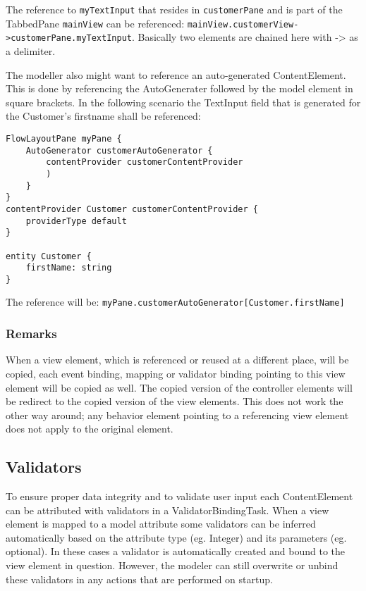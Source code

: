The reference to \lstinline!myTextInput! that resides in \lstinline!customerPane! and is part of the TabbedPane \lstinline!mainView! can be referenced: \lstinline!mainView.customerView->customerPane.myTextInput!. Basically two elements are chained here with -> as a delimiter.

The modeller also might want to reference an auto-generated ContentElement. This is done by referencing the AutoGenerater followed by the model element in square brackets. In the following scenario the TextInput field that is generated for the Customer’s firstname shall be referenced:

\begin{lstlisting}[language=MD2]
FlowLayoutPane myPane {
	AutoGenerator customerAutoGenerator {
		contentProvider customerContentProvider
		)
	}
}
contentProvider Customer customerContentProvider {
	providerType default
}

entity Customer {
	firstName: string
}
\end{lstlisting}

The reference will be: \lstinline!myPane.customerAutoGenerator[Customer.firstName]!

\subsubsection{Remarks}
When a view element, which is referenced or reused at a different place, will be copied, each event binding, mapping or validator binding pointing to this view element will be copied as well. The copied version of the controller elements will be redirect to the copied version of the view elements. This does not work the other way around; any behavior element pointing to a referencing view element does not apply to the original element.

\subsection{Validators}
To ensure proper data integrity and to validate user input each ContentElement can be attributed with validators in a ValidatorBindingTask. When a view element is mapped to a model attribute some validators can be inferred automatically based on the attribute type (eg. Integer) and its parameters (eg. optional). In these cases a validator is automatically created and bound to the view element in question. However, the modeler can still overwrite or unbind these validators in any actions that are performed on startup.

